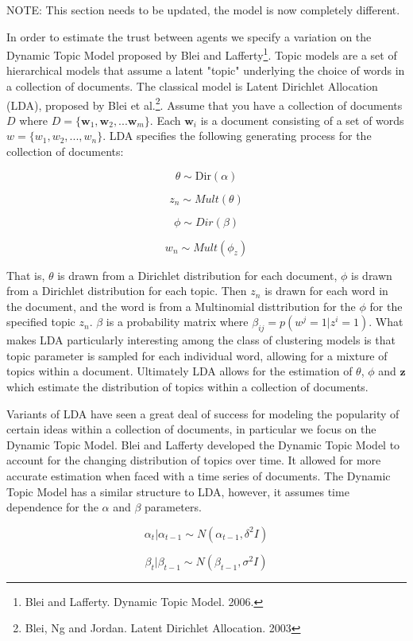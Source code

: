 \documentclass[a4paper]{article}
\begin{document}
NOTE: This section needs to be updated, the model is now completely different.

In order to estimate the trust between agents we specify a variation on the Dynamic Topic Model proposed by Blei and Lafferty\footnote{Blei and Lafferty. Dynamic Topic Model. 2006.}.  Topic models are a set of hierarchical models that assume a latent "topic" underlying the choice of words in a collection of documents.  The classical model is Latent Dirichlet Allocation (LDA), proposed by Blei et al.\footnote{Blei, Ng and Jordan. Latent Dirichlet Allocation. 2003}.  Assume that you have a collection of documents $D$ where $D = \{\textbf{w}_1, \textbf{w}_2, ... \textbf{w}_m\}$.  Each $\textbf{w}_i$ is a document consisting of a set of words $w = \{w_1, w_2, ..., w_n\}$.  LDA specifies the following generating process for the collection of documents:

\[\theta \sim \text{Dir}(\alpha)\]

\[z_n \sim Mult(\theta)\]

\[\phi \sim Dir(\beta)\]

\[w_n \sim  Mult(\phi_z)\]

That is, $\theta$ is drawn from a Dirichlet distribution for each document,  $\phi$ is drawn from a Dirichlet distribution for each topic.  Then $z_n$ is drawn for each word in the document, and the word is from a Multinomial disttribution for the $\phi$ for the specified topic $z_n$.  $\beta$ is a probability matrix where $\beta_{ij} = p(w^j = 1|z^i =1)$.  What makes LDA particularly interesting among the class of clustering models is that topic parameter is sampled for each individual word, allowing for a mixture of topics within a document.  Ultimately LDA allows for the estimation of $\theta$, $\phi$ and $\textbf{z}$ which estimate the distribution of topics within a collection of documents.

Variants of LDA have seen a great deal of success for modeling the popularity of certain ideas within a collection of documents, in particular we focus on the Dynamic Topic Model.  Blei and Lafferty developed the Dynamic Topic Model to account for the changing distribution of topics over time.  It allowed for more accurate estimation when faced with a time series of documents.  The Dynamic Topic Model has a similar structure to LDA, however, it assumes time dependence for the $\alpha$ and $\beta$ parameters.

\[\alpha_t | \alpha_{t-1} \sim N(\alpha_{t-1}, \delta^2I)\]

\[\beta_t | \beta_{t-1} \sim N(\beta_{t-1}, \sigma^2I)\]
\end{document}
